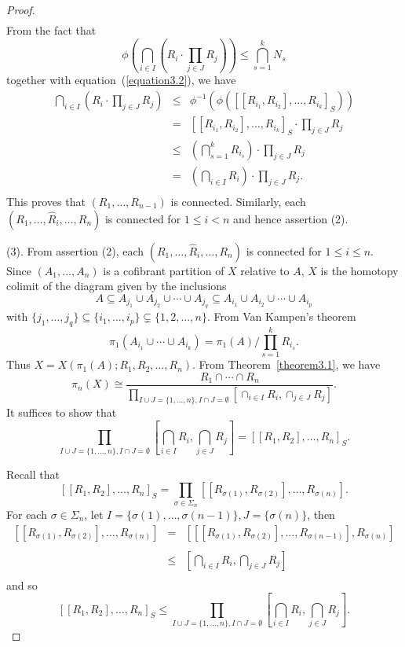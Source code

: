 \documentclass[10pt]{amsart}
\numberwithin{equation}{section}
\begin{document}
\begin{proof}
$$\begin{array}{rcl}
\end{array}
$$
From the fact that
$$
\phi\left(\bigcap_{i\in I} \left( R_i\cdot \prod_{j\in J}R_j \right)\right)\leq \bigcap_{s=1}^k N_s
$$
together with equation~(\ref{equation3.2}),
we have
$$
\begin{array}{rcl}
\bigcap_{i\in I} \left( R_i\cdot \prod_{j\in J}R_j \right)&\leq&\phi^{-1}\left(\phi\left([[R_{i_1},R_{i_2}],\ldots,R_{i_k}]_S\right)\right)\\ &=&[[R_{i_1},R_{i_2}],\ldots,R_{i_k}]_S\cdot \prod_{j\in J}R_j\\
&\leq& \left(\bigcap_{s=1}^k R_{i_s}\right)\cdot\prod_{j\in J} R_j\\
&=&\left(\bigcap_{i\in I}R_i\right)\cdot \prod_{j\in J} R_j.\\
\end{array}
$$
This proves that $(R_1,\ldots,R_{n-1})$ is connected. Similarly, each $(R_1,\ldots, \hat{R}_i,\ldots, R_n)$ is connected for $1\leq i< n$ and
hence assertion (2).

(3). From assertion (2), each $(R_1,\ldots, \hat{R}_i,\ldots, R_n)$ is connected for $1\leq i\leq n$. Since $(A_1,\ldots,A_n)$ is a cofibrant partition of $X$ relative to $A$, $X$ is the homotopy colimit of the diagram given by the inclusions
$$
A\subseteq A_{j_1}\cup A_{j_2}\cup\cdots\cup A_{j_q}\subseteq A_{i_1}\cup A_{i_2}\cup\cdots\cup A_{i_p}
$$
with $\{j_1,\ldots,j_q\}\subseteq \{i_1,\ldots,i_p\}\subsetneq \{1,2,\ldots,n\}$. From Van Kampen's theorem
$$
\pi_1(A_{i_1}\cup \cdots\cup A_{i_k})=\pi_1(A)/\prod_{s=1}^k R_{i_s}.
$$
Thus $X=X(\pi_1(A);R_1,R_2,\ldots,R_n)$. From Theorem~\ref{theorem3.1}, we have
$$
\pi_n(X)\cong \frac{R_1\cap \cdots \cap R_n}{\prod_{I\cup J=\{1,\ldots,n\},{I\cap J=\emptyset}}
[\cap_{i\in I}R_i,\cap_{j\in J}R_j]}.
$$
It suffices to show that
$$
\prod_{I\cup J=\{1,\ldots,n\}, {I\cap J=\emptyset}}
\left[\bigcap_{i\in I}R_i,\bigcap_{j\in J}R_j\right]=[[R_1,R_2],\ldots,R_n]_S.
$$

Recall that $$[[R_1,R_2],\ldots,R_n]_S=\prod_{\sigma\in \Sigma_n}[[R_{\sigma(1)},R_{\sigma(2)}],\ldots,R_{\sigma(n)}].$$
For each $\sigma\in\Sigma_n$, let $I=\{\sigma(1),\ldots,\sigma(n-1)\}, J=\{\sigma(n)\}$, then
$$
\begin{array}{rcl}
[[R_{\sigma(1)},R_{\sigma(2)}],\ldots,R_{\sigma(n)}]&=&[[[R_{\sigma(1)},R_{\sigma(2)}],\ldots,R_{\sigma(n-1)}],R_{\sigma(n)}]\\
&&\\
&\leq &\left[\bigcap_{i\in I}R_i,\bigcap_{j\in J}R_j\right]\\
\end{array}
$$
and so
$$
[[R_1,R_2],\ldots,R_n]_S\leq \prod_{I\cup J=\{1,\ldots,n\}, {I\cap J=\emptyset}}
\left[\bigcap_{i\in I}R_i,\bigcap_{j\in J}R_j\right].
$$


\end{proof}
\end{document}
